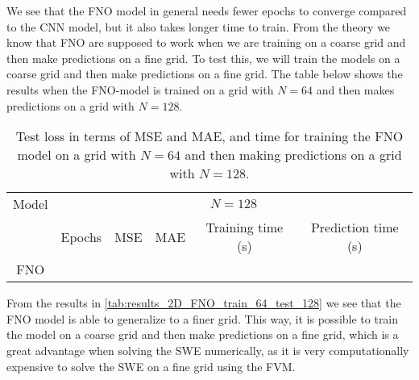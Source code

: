 We see that the FNO model in general needs fewer epochs to converge compared to the CNN model, but it also takes longer time to train.
From the theory we know that FNO are supposed to work when we are training on a coarse grid and then make predictions on a fine grid.
To test this, we will train the models on a coarse grid and then make predictions on a fine grid.
The table below shows the results when the FNO-model is trained on a grid with $N = 64$ and then makes predictions on a grid with $N = 128$.
\begin{table}[H]
    \centering
    \begin{tabular}{c|ccccc}
        Model & \multicolumn{5}{c}{$N = 128$} \\
        \cline{2-6}
        & Epochs & MSE & MAE & Training time (s) & Prediction time (s) \\
        \hline
        FNO  &
         &
         &
         &
         &
        
    \end{tabular}
    \caption{Test loss in terms of MSE and MAE, and time for training the FNO model on a grid with $N = 64$ and then making predictions on a grid with $N = 128$.}\label{tab:results_2D_FNO_train_64_test_128}
\end{table}
From the results in \autoref{tab:results_2D_FNO_train_64_test_128} we see that the FNO model is able to generalize to a finer grid.
This way, it is possible to train the model on a coarse grid and then make predictions on a fine grid, which is a great advantage when solving the SWE numerically, as it is very computationally expensive to solve the SWE on a fine grid using the FVM.
